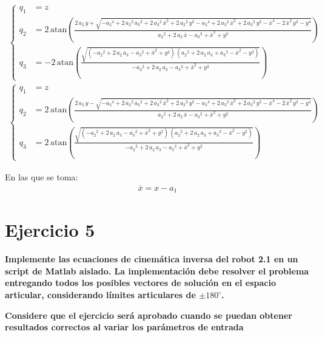 \documentclass[a4paper,12pt]{article}
\begin{document}
\begin{align*}
    \begin{cases}
        q_1 &= z\\
        q_2 &=  2\,\mathrm{atan}\left(\frac{2\,a_{2}\,y+\sqrt{-{a_{2}}^4+2\,{a_{2}}^2\,{a_{3}}^2+2\,{a_{2}}^2\,\overline{x}^2+2\,{a_{2}}^2\,y^2-{a_{3}}^4+2\,{a_{3}}^2\,\overline{x}^2+2\,{a_{3}}^2\,y^2-\overline{x}^4-2\,\overline{x}^2\,y^2-y^4}}{{a_{2}}^2+2\,a_{2}\,\overline{x}-{a_{3}}^2+\overline{x}^2+y^2}\right)\\
        q_3 &= -2\,\mathrm{atan}\left(\frac{\sqrt{\left(-{a_{2}}^2+2\,a_{2}\,a_{3}-{a_{3}}^2+\overline{x}^2+y^2\right)\,\left({a_{2}}^2+2\,a_{2}\,a_{3}+{a_{3}}^2-\overline{x}^2-y^2\right)}}{-{a_{2}}^2+2\,a_{2}\,a_{3}-{a_{3}}^2+\overline{x}^2+y^2}\right)
    \end{cases}
\end{align*}
\begin{align*}
    \begin{cases}
        q_1 &= z\\
        q_2 &= 2\,\mathrm{atan}\left(\frac{2\,a_{2}\,y-\sqrt{-{a_{2}}^4+2\,{a_{2}}^2\,{a_{3}}^2+2\,{a_{2}}^2\,\overline{x}^2+2\,{a_{2}}^2\,y^2-{a_{3}}^4+2\,{a_{3}}^2\,\overline{x}^2+2\,{a_{3}}^2\,y^2-\overline{x}^4-2\,\overline{x}^2\,y^2-y^4}}{{a_{2}}^2+2\,a_{2}\,\overline{x}-{a_{3}}^2+\overline{x}^2+y^2}\right)\\
        q_3 &= 2\,\mathrm{atan}\left(\frac{\sqrt{\left(-{a_{2}}^2+2\,a_{2}\,a_{3}-{a_{3}}^2+\overline{x}^2+y^2\right)\,\left({a_{2}}^2+2\,a_{2}\,a_{3}+{a_{3}}^2-\overline{x}^2-y^2\right)}}{-{a_{2}}^2+2\,a_{2}\,a_{3}-{a_{3}}^2+\overline{x}^2+y^2}\right)
    \end{cases}
\end{align*}

En las que se toma:
\begin{align*}
    \overline{x} = x-a_1
\end{align*}

\section{Ejercicio 5}
\textbf{Implemente las ecuaciones de cinemática inversa del robot 2.1 en un
script de Matlab aislado. La implementación debe resolver el problema entregando todos los
posibles vectores de solución en el espacio articular, considerando límites articulares de
$\pm180^\circ$.}

\textbf{Considere que el ejercicio será aprobado cuando se puedan obtener resultados correctos al
variar los parámetros de entrada}
\end{document}
